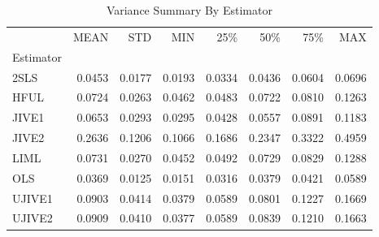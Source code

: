 \begin{table}[ht]
\centering
\caption{Variance Summary By Estimator}
\begin{tabular}{lrrrrrrr}
\toprule
 & MEAN & STD & MIN & 25\% & 50\% & 75\% & MAX \\
Estimator &  &  &  &  &  &  &  \\
\midrule
2SLS & 0.0453 & 0.0177 & 0.0193 & 0.0334 & 0.0436 & 0.0604 & 0.0696 \\
HFUL & 0.0724 & 0.0263 & 0.0462 & 0.0483 & 0.0722 & 0.0810 & 0.1263 \\
JIVE1 & 0.0653 & 0.0293 & 0.0295 & 0.0428 & 0.0557 & 0.0891 & 0.1183 \\
JIVE2 & 0.2636 & 0.1206 & 0.1066 & 0.1686 & 0.2347 & 0.3322 & 0.4959 \\
LIML & 0.0731 & 0.0270 & 0.0452 & 0.0492 & 0.0729 & 0.0829 & 0.1288 \\
OLS & 0.0369 & 0.0125 & 0.0151 & 0.0316 & 0.0379 & 0.0421 & 0.0589 \\
UJIVE1 & 0.0903 & 0.0414 & 0.0379 & 0.0589 & 0.0801 & 0.1227 & 0.1669 \\
UJIVE2 & 0.0909 & 0.0410 & 0.0377 & 0.0589 & 0.0839 & 0.1210 & 0.1663 \\
\bottomrule
\end{tabular}
\end{table}
